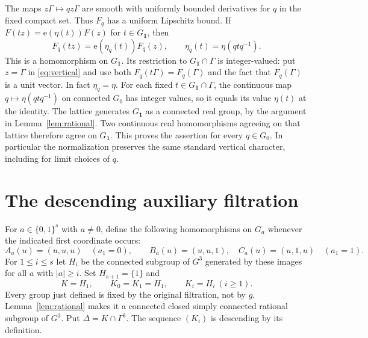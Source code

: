 \documentclass[11pt]{article}
\newcommand{\one}{\mathbf 1}
\newcommand{\ee}{\mathrm e}
\begin{document}
The maps $z\Gamma\mapsto qz\Gamma$ are smooth with uniformly bounded
derivatives for $q$ in the fixed compact set. Thus $F_q$ has a uniform
Lipschitz bound. If $F(tz)=\ee(\eta(t))F(z)$ for $t\in G_{\one}$, then
\begin{equation}\label{eq:vertical}
 F_q(tz)=\ee(\eta_q(t))F_q(z),\qquad
 \eta_q(t)=\eta(qtq^{-1}).
\end{equation}
This is a homomorphism on $G_{\one}$. Its restriction to
$G_{\one}\cap\Gamma$ is integer-valued: put $z=\Gamma$ in
\eqref{eq:vertical} and use both $F_q(t\Gamma)=F_q(\Gamma)$ and the fact that
$F_q(\Gamma)$ is a unit vector. In fact $\eta_q=\eta$. For each fixed
$t\in G_{\one}\cap\Gamma$, the continuous map
$q\mapsto\eta(qtq^{-1})$ on connected $G_0$ has integer values, so it equals
its value $\eta(t)$ at the identity. The lattice generates $G_{\one}$ as a
connected real group, by the argument in Lemma~\ref{lem:rational}.
Two continuous real homomorphisms agreeing on that lattice therefore agree
on $G_{\one}$. This proves the assertion for every $q\in G_0$.
In particular the normalization preserves the same standard vertical
character, including for limit choices of $q$.

\section{The descending auxiliary filtration}

For $a\in\{0,1\}^s$ with $a\ne0$, define the following homomorphisms on
$G_a$ whenever the indicated first coordinate occurs:
\[
 A_a(u)=(u,u,u)\quad(a_1=0),\qquad
 B_a(u)=(u,u,1),\quad C_a(u)=(u,1,u)\quad(a_1=1).
\]
For $1\leq i\leq s$ let $H_i$ be the connected subgroup of $G^3$ generated
by these images for all $a$ with $|a|\geq i$. Set $H_{s+1}=\{1\}$ and
\begin{equation}\label{eq:K}
 K=H_1,\qquad K_0=K_1=H_1,\qquad K_i=H_i\ (i\geq1).
\end{equation}
Every group just defined is fixed by the original filtration, not by $g$.
Lemma~\ref{lem:rational} makes it a connected closed simply connected rational
subgroup of $G^3$. Put $\Delta=K\cap\Gamma^3$.
The sequence $(K_i)$ is descending by its definition.
\end{document}
